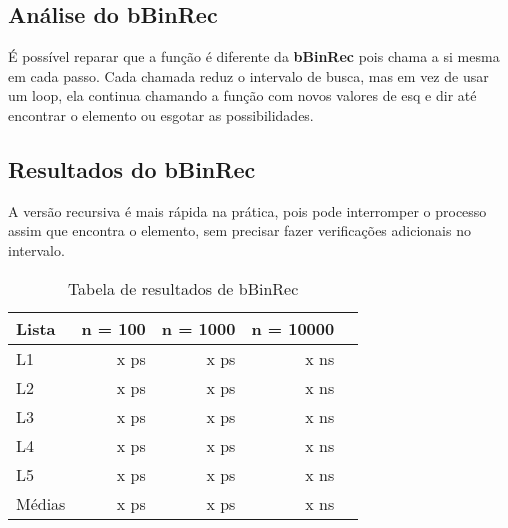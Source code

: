 \subsection{Análise do bBinRec}

É possível reparar que a função é diferente da \textbf{bBinRec} pois chama a si mesma em cada passo. Cada chamada reduz o intervalo de busca, mas em vez de usar um loop, ela continua chamando a função com novos valores de esq e dir até encontrar o elemento ou esgotar as possibilidades.

\subsection{Resultados do bBinRec}

A versão recursiva é mais rápida na prática, pois pode interromper o processo assim que encontra o elemento, sem precisar fazer verificações adicionais no intervalo.

\begin{table}[h!]
	\centering
	\caption{Tabela de resultados de bBinRec}
	\label{tab:bBin_rec_result}
	\begin{tabular}{lrrrr}
		\toprule
		Lista   & n = 100   & n = 1000  & n = 10000 \\
		\midrule
		L1      & x ps    & x ps    & x ns  \\
		L2      & x ps    & x ps    & x ns  \\
		L3      & x ps    & x ps    & x ns  \\
		L4      & x ps    & x ps    & x ns  \\
		L5      & x ps    & x ps    & x ns  \\
		\midrule
		Médias  & x ps  & x ps  & x ns \\
		\bottomrule
	\end{tabular}
\end{table}
\newpage
